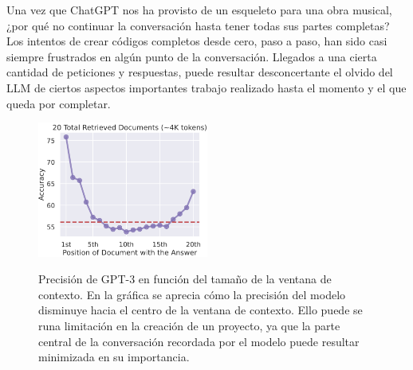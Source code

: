 Una vez que ChatGPT nos ha provisto de un esqueleto para una obra musical, ¿por qué no continuar la conversación hasta tener todas sus partes completas? Los intentos de crear códigos completos desde cero, paso a paso, han sido casi siempre frustrados en algún punto de la conversación. Llegados a una cierta cantidad de peticiones y respuestas, puede resultar desconcertante el olvido del LLM de ciertos aspectos importantes trabajo realizado hasta el momento y el que queda por completar. 


\begin{figure}[h!]
    \caption[Precisión de GPT-3 en función del tamaño de la ventana de contexto]{Precisión de GPT-3 en función del tamaño de la ventana de contexto. En la gráfica se aprecia cómo la precisión del modelo disminuye hacia el centro de la ventana de contexto. Ello puede se runa limitación en la creación de un proyecto, ya que la parte central de la conversación recordada por el modelo puede resultar minimizada en su importancia.}
    \centering
    \includegraphics[width=0.5\textwidth]{./figuras/Precision_LLM_gran_contexto.png}
    \label{fig:Precision_LLM_gran_contexto}
\end{figure}


